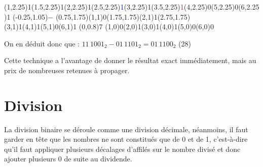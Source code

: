 \documentclass[11pt,a4paper]{article}
\begin{document}
\begin{center}
\begin{table}[ht!]
\begin{minipage}{0.1\textwidth}
  \end{minipage}
  \hfillx
  \begin{minipage}{0.15\textwidth}

\par\vspace{3\oplineheight}
\oplput(1,2.25){1}\oplput(1.5,2.25){\scriptsize \textcolor{green(htmlcssgreen)}{1}}\oplput(2,2.25){1}\oplput(2.5,2.25){\scriptsize \textcolor{blue}{1}}\oplput(3,2.25){1}\oplput(3.5,2.25){\scriptsize \textcolor{red}{1}}\oplput(4,2.25){0}\oplput(5,2.25){0}\oplput(6,2.25){1}
\oplput(-0.25,1.05){$-$}
\oplput(0.75,1.75){\tiny \textcolor{green(htmlcssgreen)}{}}\oplput(1,1){0}\oplput(1.75,1.75){\tiny \textcolor{blue}{}}\oplput(2,1){1}\oplput(2.75,1.75){\tiny \textcolor{red}{}}\oplput(3,1){1}\oplput(4,1){1}\oplput(5,1){0}\oplput(6,1){1}
\ophline(0,0.8){7}
\oplput(1,0){0}\oplput(2,0){1}\oplput(3,0){1}\oplput(4,0){1}\oplput(5,0){0}\oplput(6,0){0}

  \end{minipage}
\end{table}

\end{center}

\vspace*{-0.5cm}

On en déduit donc que : $ 11 \, 1001_{2} - 01 \, 1101_{2} = 01 \, 1100_{2} $ (28)

\bigskip

Cette technique a l'avantage de donner le résultat exact immédiatement, mais au prix de nombreuses retenues à propager.

\vfillLast

\clearpage


\section{Division}

\medskip

La division binaire se déroule comme une division décimale, néanmoins, il faut garder en tête que les nombres ne sont constitués que de 0 et de 1, c'est-à-dire qu'il faut appliquer plusieurs décalages d'affilés sur le nombre divisé et donc ajouter plusieurs 0 de suite au dividende.

%
\end{document}
